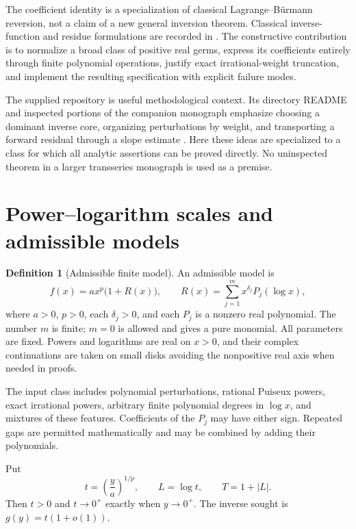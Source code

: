 \documentclass[11pt,a4paper]{article}
\theoremstyle{definition}
\newtheorem{definition}[theorem]{Definition}
\theoremstyle{remark}
\begin{document}
The coefficient identity is a specialization of classical
Lagrange--B\"urmann reversion, not a claim of a new general inversion theorem.
Classical inverse-function and residue formulations are recorded in
\cite{dlmf}. The constructive contribution is to normalize a broad class of
positive real germs, express its coefficients entirely through finite
polynomial operations, justify exact irrational-weight truncation, and
implement the resulting specification with explicit failure modes.

The supplied repository is useful methodological context. Its directory
README and inspected portions of the companion monograph emphasize choosing
a dominant inverse core, organizing perturbations by weight, and transporting
a forward residual through a slope estimate \cite{repo,companion}. Here these
ideas are specialized to a class for which all analytic assertions can be
proved directly. No uninspected theorem in a larger transseries monograph is
used as a premise.

\section{Power--logarithm scales and admissible models}
\label{sec:scales}

\begin{definition}[Admissible finite model]\label{def:model}
An admissible model is
\begin{equation}\label{eq:model}
 f(x)=a x^p\bigl(1+R(x)\bigr),\qquad
 R(x)=\sum_{j=1}^{m}x^{\delta_j}P_j(\log x),
\end{equation}
where $a>0$, $p>0$, each $\delta_j>0$, and each $P_j$ is a nonzero real
polynomial. The number $m$ is finite; $m=0$ is allowed and gives a pure
monomial. All parameters are fixed. Powers and logarithms are real on
$x>0$, and their complex continuations are taken on small disks avoiding the
nonpositive real axis when needed in proofs.
\end{definition}

The input class includes polynomial perturbations, rational Puiseux powers,
exact irrational powers, arbitrary finite polynomial degrees in $\log x$,
and mixtures of these features. Coefficients of the $P_j$ may have either
sign. Repeated gaps are permitted mathematically and may be combined by adding
their polynomials.

Put
\begin{equation}\label{eq:normalization}
 t=\left(\frac ya\right)^{1/p},\qquad L=\log t,
 \qquad T=1+|L|.
\end{equation}
Then $t>0$ and $t\to0^+$ exactly when $y\to0^+$. The inverse sought is
$g(y)=t(1+o(1))$.
\end{document}

